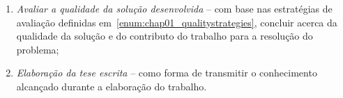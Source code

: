 \begin{enumerate}
    \item
    \label{enum:chap01_objectives_8}
    {
        \textit{Avaliar a qualidade da solução desenvolvida} -- com base nas estratégias de avaliação definidas em~\ref{enum:chap01_qualitystrategies}, concluir acerca da qualidade da solução e do contributo do trabalho para a resolução do problema;
    }
    \item
    \label{enum:chap01_objectives_9}
    {
        \textit{Elaboração da tese escrita} -- como forma de transmitir o conhecimento alcançado durante a elaboração do trabalho.
    }
\end{enumerate}